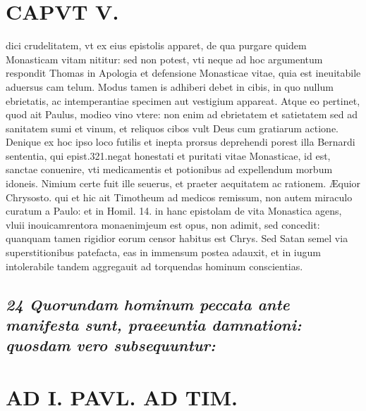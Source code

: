 \documentclass{article}
\begin{document}
\begin{pages}
\section*{CAPVT V. }
\marginpar{[ p.383 ]}\pstart dici crudelitatem, vt ex eius epistolis apparet, de qua purgare quidem Monasticam vitam nititur: sed non potest, vti neque ad hoc argumentum respondit Thomas in Apologia et defensione Monasticae vitae, quia est ineuitabile aduersus cam telum. Modus tamen is adhiberi debet in cibis, in quo nullum ebrietatis, ac intemperantiae specimen aut vestigium appareat.  \pend\pstart Atque eo pertinet, quod ait Paulus, modieo vino vtere: non enim ad ebrietatem et satietatem sed ad sanitatem sumi et vinum, et reliquos cibos vult Deus cum gratiarum actione.  \pend\pstart Denique  ex hoc ipso loco futilis et inepta prorsus deprehendi porest illa Bernardi sententia, qui epist.321.negat honestati et puritati vitae Monasticae, id est, sanctae conuenire, vti medicamentis et potionibus ad expellendum morbum idoneis. Nimium certe fuit ille seuerus, et praeter aequitatem ac rationem. Æquior Chrysosto. qui et hic ait Timotheum ad medicos remissum, non autem miraculo curatum a Paulo: et in Homil. 14. in hanc epistolam de vita Monastica agens, vluii inouicamrentora monaenimjeum est opus, non adimit, sed concedit: quanquam tamen rigidior eorum censor habitus est Chrys. Sed Satan semel via superstitionibus patefacta, eas in immensum postea adauxit, et in iugum intolerabile tandem aggregauit ad torquendas hominum conscientias.  \pend
{}
{}
\subsection*{\textit{24 Quorundam hominum peccata ante manifesta sunt, praeeuntia damnationi: quosdam vero subsequuntur: }}
\section*{AD I. PAVL. AD TIM. }
\marginpar{[ p.324 ]}
{}

\end{pages}
\end{document}
